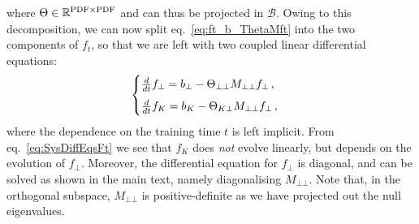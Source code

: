 where $\Theta \in \mathbb{R}^{\textrm{PDF} \times \textrm{PDF}}$ and can thus be projected in $\mathcal{B}$. Owing to this decomposition,
we can now split eq.~\eqref{eq:ft_b_ThetaMft} into the two components of $f_t$, so that we are
left with two coupled linear differential equations:
\begin{equation}
  \label{eq:SysDiffEqsFt}
  \begin{cases}
    \frac{d}{dt} f_{\bot} = b_{\bot} - \Theta_{\bot\bot} M_{\bot\bot} f_{\bot} \,,\\[5pt]
    \frac{d}{dt} f_{K} = b_{K} - \Theta_{K\bot} M_{\bot\bot} f_{\bot} \,,\\
  \end{cases}
\end{equation}
where the dependence on the training time $t$ is left implicit. From eq.~\eqref{eq:SysDiffEqsFt}
we see that $f_{K}$ does \textit{not} evolve linearly, but depends on the evolution of $f_{\bot}$.
Moreover, the differential equation for $f_{\bot}$ is diagonal, and can be solved as shown in the
main text, namely diagonalising $M_{\bot \bot}$. Note that, in the orthogonal subspace, $M_{\bot \bot}$
is positive-definite as we have projected out the null eigenvalues.
